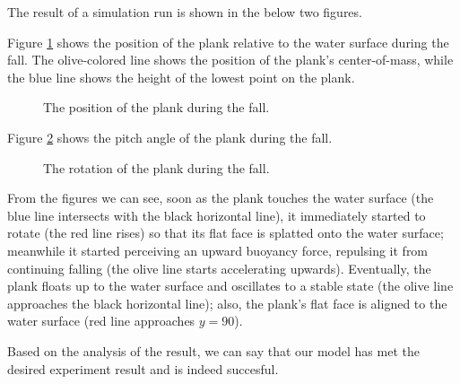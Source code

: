 The result of a simulation run is shown in the below two figures.

Figure \ref{simulation-result-heights} shows the position of the plank relative to the water surface during the fall.
The olive-colored line shows the position of the plank's center-of-mass, while the blue line shows the height of the lowest point on the plank.

\begin{figure}[htb]
	\centering
	\caption{The position of the plank during the fall.}
	\label{simulation-result-heights}
\end{figure}

Figure \ref{simulation-result-rot} shows the pitch angle of the plank during the fall.

\begin{figure}[htb]
	\centering
	\caption{The rotation of the plank during the fall.}
	\label{simulation-result-rot}
\end{figure}

From the figures we can see, soon as the plank touches the water surface (the blue line intersects with the black horizontal line), it immediately started to rotate (the red line rises) so that its flat face is splatted onto the water surface;
meanwhile it started perceiving an upward buoyancy force, repulsing it from continuing falling (the olive line starts accelerating upwards).
Eventually, the plank floats up to the water surface and oscillates to a stable state (the olive line approaches the black horizontal line);
also, the plank's flat face is aligned to the water surface (red line approaches $y=90$).

Based on the analysis of the result, we can say that our model has met the desired experiment result and is indeed succesful.